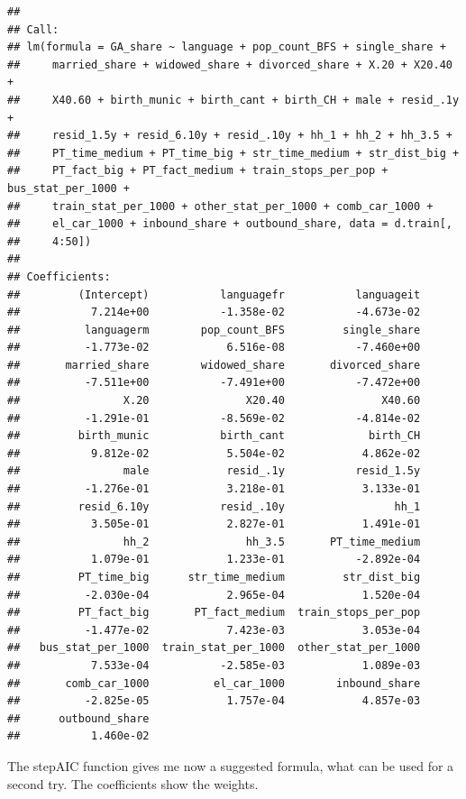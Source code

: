 \documentclass[
]{article}
\begin{document}
\begin{verbatim}
## 
## Call:
## lm(formula = GA_share ~ language + pop_count_BFS + single_share + 
##     married_share + widowed_share + divorced_share + X.20 + X20.40 + 
##     X40.60 + birth_munic + birth_cant + birth_CH + male + resid_.1y + 
##     resid_1.5y + resid_6.10y + resid_.10y + hh_1 + hh_2 + hh_3.5 + 
##     PT_time_medium + PT_time_big + str_time_medium + str_dist_big + 
##     PT_fact_big + PT_fact_medium + train_stops_per_pop + bus_stat_per_1000 + 
##     train_stat_per_1000 + other_stat_per_1000 + comb_car_1000 + 
##     el_car_1000 + inbound_share + outbound_share, data = d.train[, 
##     4:50])
## 
## Coefficients:
##         (Intercept)           languagefr           languageit  
##           7.214e+00           -1.358e-02           -4.673e-02  
##          languagerm        pop_count_BFS         single_share  
##          -1.773e-02            6.516e-08           -7.460e+00  
##       married_share        widowed_share       divorced_share  
##          -7.511e+00           -7.491e+00           -7.472e+00  
##                X.20               X20.40               X40.60  
##          -1.291e-01           -8.569e-02           -4.814e-02  
##         birth_munic           birth_cant             birth_CH  
##           9.812e-02            5.504e-02            4.862e-02  
##                male            resid_.1y           resid_1.5y  
##          -1.276e-01            3.218e-01            3.133e-01  
##         resid_6.10y           resid_.10y                 hh_1  
##           3.505e-01            2.827e-01            1.491e-01  
##                hh_2               hh_3.5       PT_time_medium  
##           1.079e-01            1.233e-01           -2.892e-04  
##         PT_time_big      str_time_medium         str_dist_big  
##          -2.030e-04            2.965e-04            1.520e-04  
##         PT_fact_big       PT_fact_medium  train_stops_per_pop  
##          -1.477e-02            7.423e-03            3.053e-04  
##   bus_stat_per_1000  train_stat_per_1000  other_stat_per_1000  
##           7.533e-04           -2.585e-03            1.089e-03  
##       comb_car_1000          el_car_1000        inbound_share  
##          -2.825e-05            1.757e-04            4.857e-03  
##      outbound_share  
##           1.460e-02
\end{verbatim}

The stepAIC function gives me now a suggested formula, what can be used
for a second try. The coefficients show the weights.
\end{document}

